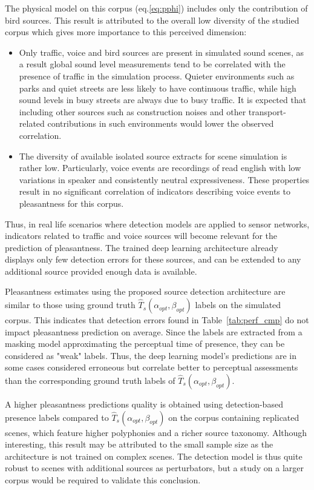 \documentclass[11pt,a4paper]{article}
\begin{document}
The physical model on this corpus (eq.\ref{eq:pphi}) includes only the contribution of bird sources. This result is attributed to the overall low diversity of the studied corpus which gives more importance to this perceived dimension:
\begin{itemize}
\item Only traffic, voice and bird sources are present in simulated sound scenes, as a result global sound level measurements tend to be correlated with the presence of traffic in the simulation process. Quieter environments such as parks and quiet streets are less likely to have continuous traffic, while high sound levels in busy streets are always due to busy traffic. It is expected that including other sources such as construction noises and other transport-related contributions in such environments would lower the observed correlation.
\item The diversity of available isolated source extracts for scene simulation is rather low. Particularly, voice events are recordings of read english with low variations in speaker and consistently neutral expressiveness. These properties result in no significant correlation of indicators describing voice events to pleasantness for this corpus.
\end{itemize}
Thus, in real life scenarios where detection models are applied to sensor networks, indicators related to traffic and voice sources will become relevant for the prediction of pleasantness. The trained deep learning architecture already displays only few detection errors for these sources, and can be extended to any additional source provided enough data is available.

Pleasantness estimates using the proposed source detection architecture are similar to those using ground truth $\hat T_s(\alpha_{opt}, \beta_{opt})$ labels on the simulated corpus. This indicates that detection errors found in Table~\ref{tab:perf_cmp} do not impact pleasantness prediction on average. Since the labels are extracted from a masking model approximating the perceptual time of presence, they can be considered as "weak" labels. Thus, the deep learning model's predictions are in some cases considered erroneous but correlate better to perceptual assessments than the corresponding ground truth labels of $\hat T_s(\alpha_{opt}, \beta_{opt})$.

A higher pleasantness predictions quality is obtained using detection-based presence labels compared to $\hat T_s(\alpha_{opt}, \beta_{opt})$ on the corpus containing replicated scenes, which feature higher polyphonies and a richer source taxonomy. Although interesting, this result may be attributed to the small sample size as the architecture is not trained on complex scenes. The detection model is thus quite robust to scenes with additional sources as perturbators, but a study on a larger corpus would be required to validate this conclusion.
\end{document}
